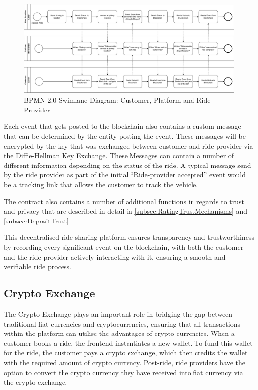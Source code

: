 \begin{figure}[h]
    \centering
    \includegraphics[width=\linewidth]{data/1.svg}
    \caption{BPMN 2.0 Swimlane Diagram: Customer, Platform and Ride Provider}
    \label{fig:SwimLaneCustomer}
\end{figure}


Each event that gets posted to the blockchain also contains a custom message that can be determined by the entity posting the event. These messages will be encrypted by the key that was exchanged between customer and ride provider via the Diffie-Hellman Key Exchange. These Messages can contain a number of different information depending on the status of the ride. A typical message send by the ride provider as part of the initial ``Ride-provider accepted'' event would be a tracking link that allows the customer to track the vehicle. 

The contract also contains a number of additional functions in regards to trust and privacy that are described in detail in \ref{subsec:RatingTrustMechanisms} and \ref{subsec:DepositTrust}.

This decentralised ride-sharing platform ensures transparency and trustworthiness by recording every significant event on the blockchain, with both the customer and the ride provider actively interacting with it, ensuring a smooth and verifiable ride process.


\subsection{Crypto Exchange}\label{subsec:CryptoExchange}

The Crypto Exchange plays an important role in bridging the gap between traditional fiat currencies and cryptocurrencies, ensuring that all transactions within the platform can utilise the advantages of crypto currencies. When a customer books a ride, the frontend instantiates a new wallet. To fund this wallet for the ride, the customer pays a crypto exchange, which then credits the wallet with the required amount of crypto currency. Post-ride, ride providers have the option to convert the crypto currency they have received into fiat currency via the crypto exchange.

